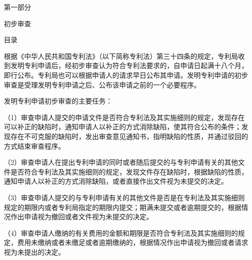 \cleardoublepage{}\resetchapters
\thispagestyle{plainempty}\hypertarget{gpos.p1}{}\begingroup\centering\guidecenterpage
\dadati\fontsize{29.04bp}{43bp}\selectfont
\vspace*{242bp}
第一部分\par
初步审查\par
{}
{}
\endgroup\clearpage
\cleardoublepage\pagestyle{tocpage}
\gdef\guidetabcontent{\hbox{第}\hbox{一}\hbox{部}\hbox{分}}
{\centering\guidecenterpage\heiti\fontsize{14.04bp}{21bp}\selectfont 目\quad 录\par}
\vspace{6bp}
\clearpage\pagestyle{main}
根据《中华人民共和国专利法》（以下简称专利法）第三十四条的规定，专利局收到发明专利申请后，经初步审查认为符合专利法要求的，自申请日起满十八个月，即行公布。专利局也可以根据申请人的请求早日公布其申请。发明专利申请的初步审查是受理发明专利申请之后、公布该申请之前的一个必要程序。

{\kaiti 发明专利申请初步审查的主要任务：}

{\setlength{\parindent}{17.1bp}（1）审查申请人提交的申请文件是否符合专利法及其实施细则的规定，发现存在可以补正的缺陷时，通知申请人以补正的方式消除缺陷，使其符合公布的条件；发现存在不可克服的缺陷时，发出审查意见通知书，指明缺陷的性质，并通过驳回的方式结束审查程序。\par}

{\setlength{\parindent}{17.1bp}（2）审查申请人在提出专利申请的同时或者随后提交的与专利申请有关的其他文件是否符合专利法及其实施细则的规定，发现文件存在缺陷时，根据缺陷的性质，通知申请人以补正的方式消除缺陷，或者直接作出文件视为未提交的决定。\par}

{\setlength{\parindent}{17.1bp}（3）审查申请人提交的与专利申请有关的其他文件是否是在专利法及其实施细则规定的期限内或者专利局指定的期限内提交；期满未提交或者逾期提交的，根据情况作出申请视为撤回或者文件视为未提交的决定。\par}

{\setlength{\parindent}{17.1bp}（4）审查申请人缴纳的有关费用的金额和期限是否符合专利法及其实施细则的规定，费用未缴纳或者未缴足或者逾期缴纳的，根据情况作出申请视为撤回或者请求视为未提出的决定。\par}


